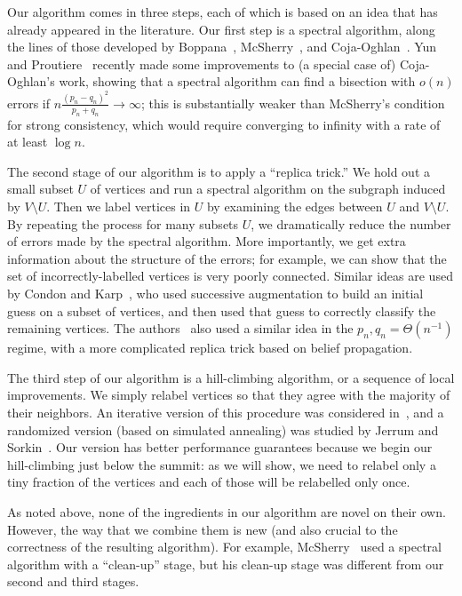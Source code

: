 \documentclass[EJP]{ejpecp}
\newcommand{\1}[1]{\mathbbm{1}_{\{#1\}}}
\begin{document}
Our algorithm comes in three steps, each of which is based on an idea that has already
appeared in the literature. Our first step is a spectral algorithm, along the lines of those
developed by Boppana~\cite{B:87}, McSherry~\cite{M:01}, and Coja-Oghlan~\cite{CO:10}.
Yun and Proutiere~\cite{YunProutiere:14} recently made some improvements to (a special case of) Coja-Oghlan's work,
showing that a spectral algorithm can find a bisection with $o(n)$ errors
if $n \frac{(p_n - q_n)^2}{p_n + q_n} \to \infty$; this is substantially weaker than McSherry's condition for strong consistency, which would
require converging to infinity with a rate of at least $\log n$.

The second stage of our algorithm is to apply a ``replica trick.'' We hold out a small subset $U$ of vertices
and run a spectral algorithm on the subgraph induced by $V \setminus U$. Then we label vertices in $U$ by examining
the edges between $U$ and $V \setminus U$. By repeating the process for many subsets $U$, we dramatically
reduce the number of errors made by the spectral algorithm. More importantly, we get extra information
about the structure of the errors; for example, we can show that the set of incorrectly-labelled vertices
is very poorly connected. Similar ideas are used by Condon and Karp~\cite{CK:01}, who used successive augmentation
to build an initial guess on a subset of vertices, and then used that guess to correctly classify the
remaining vertices. The authors~\cite{MoNeSl:14b} also used a similar idea in the $p_n, q_n = \Theta(n^{-1})$
regime, with a more complicated replica trick based on belief propagation.

The third step of our algorithm is a hill-climbing algorithm, or a sequence of local improvements.
We simply relabel vertices so that they agree with the majority of their neighbors.
An iterative version of this procedure was
considered in~\cite{CI:01}, and a randomized version (based on simulated annealing) was studied by
Jerrum and Sorkin~\cite{JS:98}. Our version has better performance guarantees because we
begin our hill-climbing just below the summit: as we will show, we need to relabel only a tiny fraction
of the vertices and each of those will be relabelled only once.

As noted above, none of the ingredients in our algorithm are novel on their own. However,
the way that we combine them is new (and also crucial to the correctness
of the resulting algorithm). For example, McSherry~\cite{M:01} used a spectral
algorithm with a ``clean-up'' stage, but his clean-up stage was different from our
second and third stages.
\end{document}
